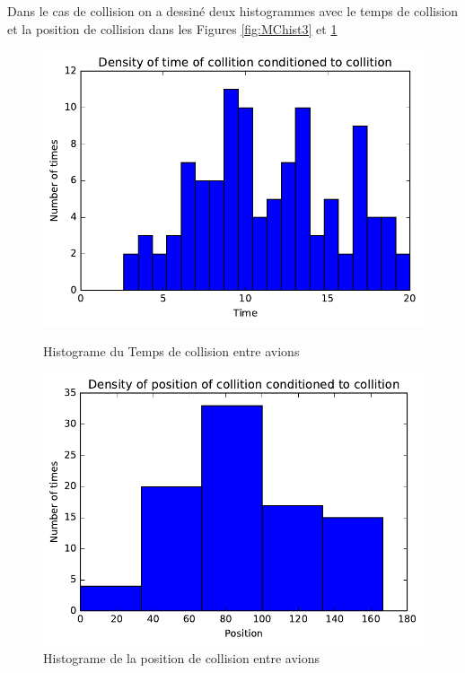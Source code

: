 \documentclass[a4paper, 12pt,twoside]{article}
\numberwithin{equation}{subsection}
\newlength{\mylength}
\begin{document}
	Dans le cas de collision on a dessiné deux histogrammes avec le temps de collision et la position de collision dans les Figures \ref{fig:MChist3} et \ref{fig:MChist4}
	
	\begin{figure}[htbp]
		\centering
		\begin{minipage}[b]{\mylength}
			\includegraphics[width=\textwidth]{Images/Script_5_6}
			\caption{Histograme du Temps de collision entre avions}
			\label{fig:MChist3}
		\end{minipage}
		\hfill
		\begin{minipage}[b]{\mylength}
			\includegraphics[width=\textwidth]{Images/Script_5_7}
			\caption{Histograme de la position de collision entre avions}
			\label{fig:MChist4}
		\end{minipage}
	\end{figure}
	
\end{document}
